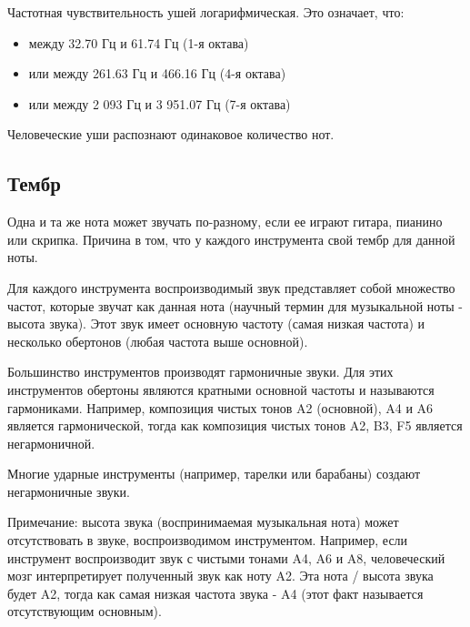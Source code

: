 
Частотная чувствительность ушей логарифмическая. Это означает, что:
\begin{itemize}
    \item между 32.70 Гц и 61.74 Гц (1-я октава)
    \item или между 261.63 Гц и 466.16 Гц (4-я октава)
    \item или между 2 093 Гц и 3 951.07 Гц (7-я октава)
\end{itemize}

Человеческие уши распознают одинаковое количество нот.

\subsection{Тембр}
Одна и та же нота может звучать по-разному, если ее играют гитара, пианино или скрипка.
Причина в том, что у каждого инструмента свой тембр для данной ноты.

Для каждого инструмента воспроизводимый звук представляет собой множество частот,
которые звучат как данная нота (научный термин для музыкальной ноты - высота звука).
Этот звук имеет основную частоту (самая низкая частота) и несколько обертонов (любая частота выше основной).

Большинство инструментов производят гармоничные звуки.
Для этих инструментов обертоны являются кратными основной частоты и называются гармониками.
Например, композиция чистых тонов A2 (основной), A4 и A6 является гармонической,
тогда как композиция чистых тонов A2, B3, F5 является негармоничной.

Многие ударные инструменты (например, тарелки или барабаны) создают негармоничные звуки.

Примечание: высота звука (воспринимаемая музыкальная нота) может отсутствовать в звуке,
воспроизводимом инструментом. Например, если инструмент воспроизводит звук с чистыми
тонами A4, A6 и A8, человеческий мозг интерпретирует полученный звук как ноту A2.
Эта нота / высота звука будет A2, тогда как самая низкая частота звука - A4
(этот факт называется отсутствующим основным).

